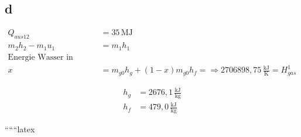 

\subsection*{d}

\begin{align*}
Q_{aus12} &= 35 \, \text{MJ} \\
m_2 h_2 - m_1 u_1 &= m_1 h_1 \\
\text{Energie Wasser in Kessel Zustand 1} \\
x &= m_{g0} h_g + (1 - x) m_{g0} h_f = \Rightarrow 2706898,75 \, \frac{\text{kJ}}{\text{K}} = H_{gas}^1
\end{align*}

\begin{align*}
h_g &= 2676,1 \, \frac{\text{kJ}}{\text{kg}} \\
h_f &= 479,0 \, \frac{\text{kJ}}{\text{kg}}
\end{align*}

``````latex